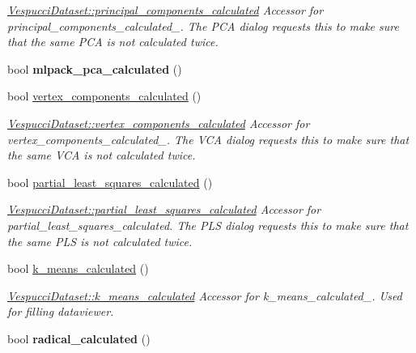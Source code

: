 \begin{DoxyCompactItemize}
\begin{DoxyCompactList}\small\item\em \hyperlink{class_vespucci_dataset_a8f9cb5f4e13fd2cb40b88907213d671a}{Vespucci\+Dataset\+::principal\+\_\+components\+\_\+calculated} Accessor for principal\+\_\+components\+\_\+calculated\+\_\+. The P\+C\+A dialog requests this to make sure that the same P\+C\+A is not calculated twice. \end{DoxyCompactList}\item 
\hypertarget{class_vespucci_dataset_aca96f1b0e3aa4e634ff95e9d2491fed9}{bool {\bfseries mlpack\+\_\+pca\+\_\+calculated} ()}\label{class_vespucci_dataset_aca96f1b0e3aa4e634ff95e9d2491fed9}

\item 
bool \hyperlink{class_vespucci_dataset_a3c0e14745c1346fb9598cd266067aa17}{vertex\+\_\+components\+\_\+calculated} ()
\begin{DoxyCompactList}\small\item\em \hyperlink{class_vespucci_dataset_a3c0e14745c1346fb9598cd266067aa17}{Vespucci\+Dataset\+::vertex\+\_\+components\+\_\+calculated} Accessor for vertex\+\_\+components\+\_\+calculated\+\_\+. The V\+C\+A dialog requests this to make sure that the same V\+C\+A is not calculated twice. \end{DoxyCompactList}\item 
bool \hyperlink{class_vespucci_dataset_a6e9531435042c5f6a38235d4d3021571}{partial\+\_\+least\+\_\+squares\+\_\+calculated} ()
\begin{DoxyCompactList}\small\item\em \hyperlink{class_vespucci_dataset_a6e9531435042c5f6a38235d4d3021571}{Vespucci\+Dataset\+::partial\+\_\+least\+\_\+squares\+\_\+calculated} Accessor for partial\+\_\+least\+\_\+squares\+\_\+calculated. The P\+L\+S dialog requests this to make sure that the same P\+L\+S is not calculated twice. \end{DoxyCompactList}\item 
bool \hyperlink{class_vespucci_dataset_a8679cd7dd55d7e27b957626de4398fe8}{k\+\_\+means\+\_\+calculated} ()
\begin{DoxyCompactList}\small\item\em \hyperlink{class_vespucci_dataset_a8679cd7dd55d7e27b957626de4398fe8}{Vespucci\+Dataset\+::k\+\_\+means\+\_\+calculated} Accessor for k\+\_\+means\+\_\+calculated\+\_\+. Used for filling dataviewer. \end{DoxyCompactList}\item 
\hypertarget{class_vespucci_dataset_a2a1d250e8d83ded5b751a442e7c42521}{bool {\bfseries radical\+\_\+calculated} ()}\label{class_vespucci_dataset_a2a1d250e8d83ded5b751a442e7c42521}


\end{DoxyCompactItemize}
